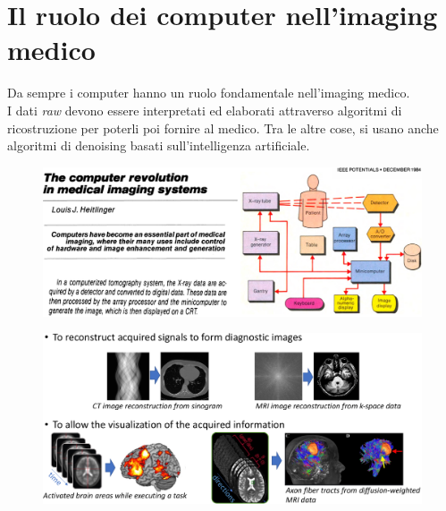 \section{Il ruolo dei computer nell'imaging medico}
Da sempre i computer hanno un ruolo fondamentale nell'imaging medico.\\
I dati \textit{raw} devono essere interpretati ed elaborati attraverso algoritmi di ricostruzione per poterli poi fornire al medico. Tra le altre cose, si usano anche algoritmi di denoising basati sull'intelligenza artificiale.\\

\begin{figure}[ht]
	\centering
	\includegraphics[width=1\linewidth]{figure_med/computers}
\end{figure}
\FloatBarrier


\begin{figure}[ht]
	\centering
	\includegraphics[width=1\linewidth]{figure_med/computer_role}
\end{figure}
\FloatBarrier

